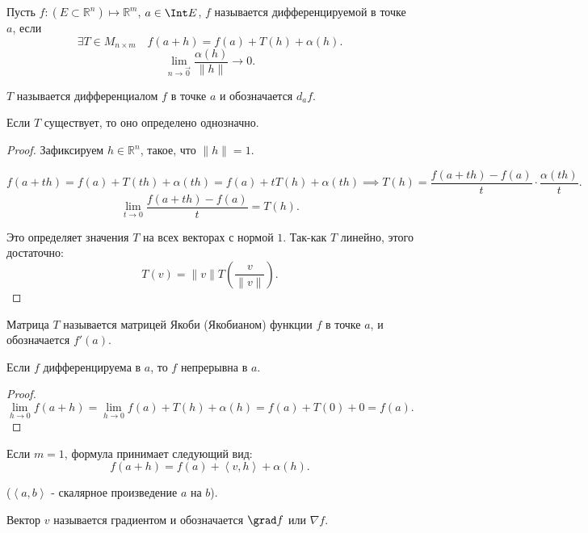 \begin{definition} \thmslashn 

    Пусть $f : (E \subset \mathbb{R}^{n}) \mapsto \mathbb{R}^{m}$, $a\in \Int E$, $f$ называется дифференцируемой в точке $a$, если 
    \[ \exists{T\in M_{n \times m}}\quad f(a+h) = f(a) + T(h) + \alpha(h) .\]
    \[ \lim\limits_{n \to \vec{0}} \frac{\alpha(h)}{\|h\|} \to 0  .\]

    $T$ называется дифференциалом $f$ в точке $a$ и обозначается $d_{a}f$.
\end{definition}
\begin{remark} \thmslashn

    Если $T$ существует, то оно определено однозначно.
    \begin{proof} \thmslashn
    
        Зафиксируем $h\in \mathbb{R}^{n}$, такое, что $\|h\| = 1$. 

        \[ f(a+th) = f(a) + T(th) + \alpha(th) = f(a) + tT(h) + \alpha(th) \implies T(h) = \frac{f(a+th)-f(a)}{t} \cdot \frac{\alpha(th)}{t} .\]
        \[ \lim\limits_{t \to 0} \frac{f(a+th)-f(a)}{t} = T(h) .\]

        Это определяет значения $T$ на всех векторах с нормой $1$. Так-как $T$ линейно, этого достаточно:
        \[ T(v) = \|v\|T\left( \frac{v}{\|v\|} \right)  .\] 
    \end{proof}
\end{remark}
\begin{definition} \thmslashn 

    Матрица $T$ называется матрицей Якоби (Якобианом) функции $f$ в точке $a$, и обозначается $f'(a)$.
\end{definition}
\begin{remark} \thmslashn

    Если $f$ дифференцируема в $a$, то $f$ непрерывна в  $a$.

    \begin{proof} \thmslashn
    
        \[ \lim\limits_{h \to 0} f(a+h) = \lim\limits_{h \to 0} f(a) + T(h) + \alpha(h) = f(a) + T(0) + 0 = f(a) .\] 
    \end{proof}
\end{remark}
\begin{remark} \thmslashn

    Если $m=1$, формула принимает следующий вид:
    \[ f(a+h) = f(a) + \left<v, h\right> + \alpha(h)  .\]

    ($\left<a, b\right>$ - скалярное произведение $a$ на $b$).

    Вектор $v$ называется градиентом и обозначается $\grad f$ или $\nabla f$.
\end{remark}
